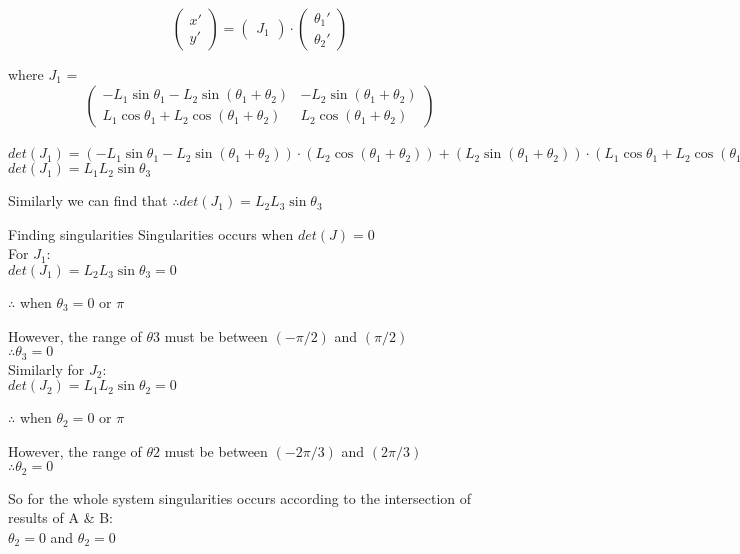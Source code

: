 $$
\begin{pmatrix}
x'\\y'
\end{pmatrix} =
\begin{pmatrix}
J_{1}
\end{pmatrix}\cdot
\begin{pmatrix}
\theta_{1}'\\\theta_{2}'
\end{pmatrix}
$$

\hspace{40mm} where $J_{1}$ = 
$$
\begin{pmatrix}
- L_{1}\sin\theta_{1} - L_{2}\sin(\theta_{1} + \theta_{2}) & -L_{2}\sin(\theta_{1} + \theta_{2})\\
L_{1}\cos\theta_{1} + L_{2}\cos(\theta_{1} + \theta_{2}) & L_{2}\cos(\theta_{1} + \theta_{2})
\end{pmatrix}
$$\\

$det(J_{1}) = (- L_{1}\sin\theta_{1} - L_{2}\sin(\theta_{1} + \theta_{2}))\cdot(L_{2}\cos(\theta_{1} + \theta_{2})) + (L_{2}\sin(\theta_{1} + \theta_{2}))\cdot(L_{1}\cos\theta_{1} + L_{2}\cos(\theta_{1} + \theta_{2}))$\\

$det(J_{1}) = L_{1}L_{2}\sin\theta_{3}$\\
\newline
\vspace{5mm}

Similarly we can find that
\newline
\vspace{5mm}
$\therefore det(J_{1}) = L_{2}L_{3}\sin\theta_{3}$\\
\vspace{2mm}

Finding singularities
Singularities occurs when $det⁡(J)=0$\\

For $J_{1}$:\\

$det(J_{1}) = L_{2}L_{3}\sin\theta_{3} = 0$

$\therefore $ when $ \theta_{3} = 0$ or $\pi$

However, the range of $\theta{3}$ must be between $(-\pi/2)$ and $(\pi/2)$\\
$\therefore \theta_{3} = 0$\\
\newline
\vspace{5mm}
Similarly for $J_{2}$:\\

$det(J_{2}) = L_{1}L_{2}\sin\theta_{2} = 0$

$\therefore $ when $ \theta_{2} = 0$ or $\pi$

However, the range of $\theta{2}$ must be between $(-2\pi/3)$ and $(2\pi/3)$\\
$\therefore \theta_{2} = 0$

So for the whole system singularities occurs according to the intersection of results of A & B:\\
$\theta_{2} = 0$ and $ \theta_{2} = 0$